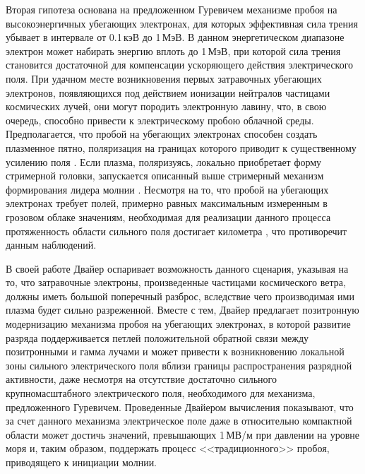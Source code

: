 Вторая гипотеза основана на предложенном Гуревичем \cite{Gurevich1992} механизме пробоя на высокоэнергичных убегающих электронах, для которых эффективная сила трения убывает в интервале от 0.1\,кэВ до 1\,МэВ. В данном энергетическом диапазоне электрон может набирать энергию вплоть до 1\,МэВ, при которой сила трения становится достаточной для компенсации ускоряющего действия электрического поля. При удачном месте возникновения первых затравочных убегающих электронов, появляющихся под действием ионизации нейтралов частицами космических лучей, они могут породить электронную лавину, что, в свою очередь, способно привести к электрическому пробою облачной среды. Предполагается, что пробой на убегающих электронах способен создать плазменное пятно, поляризация на границах которого приводит к существенному усилению поля \cite{Gurevich1999}. Если плазма, поляризуясь, локально приобретает форму стримерной головки, запускается описанный выше стримерный механизм формирования лидера молнии \cite{Gurevich1999}. Несмотря на то, что пробой на убегающих электронах требует полей, примерно равных максимальным измеренным в грозовом облаке значениям, необходимая для реализации данного процесса протяженность области сильного поля достигает километра \cite{Gurevich2001}, что противоречит данным наблюдений.

В своей работе \cite{Dwyer2005} Двайер оспаривает возможность данного сценария, указывая на то, что затравочные электроны, произведенные частицами космического ветра, должны иметь большой поперечный разброс, вследствие чего производимая ими плазма будет сильно разреженной. Вместе с тем, Двайер предлагает позитронную модернизацию механизма пробоя на убегающих электронах, в которой развитие разряда поддерживается петлей положительной обратной связи между позитронными и гамма лучами и может привести к возникновению локальной зоны сильного электрического поля вблизи границы распространения разрядной активности, даже несмотря на отсутствие достаточно сильного крупномасштабного электрического поля, необходимого для механизма, предложенного Гуревичем. Проведенные Двайером вычисления показывают, что за счет данного механизма электрическое поле даже в относительно компактной области может достичь значений, превышающих 1\,МВ/м при давлении на уровне моря и, таким образом, поддержать процесс <<традиционного>> пробоя, приводящего к инициации молнии.


